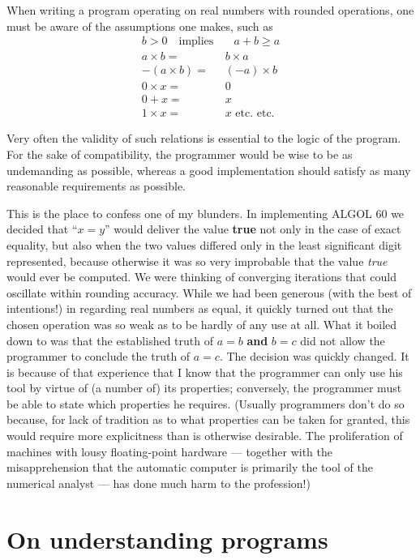 When writing a program operating on real numbers with rounded operations, one must be aware of the assumptions one makes, such as
\begin{equation*}
	\begin{split}
		b > 0\quad \text{implies}&\quad a + b \geqslant a\\
		a\times b =&\ b\times a\\
		-(a \times  b) =&\ (-a)\times b\\
		0\times  x =&\ 0\\
		0 + x =&\ x\\
		1\times x =&\ x\text{ etc. etc.}
	\end{split}
\end{equation*}

Very often the validity of such relations is essential to the logic of the program. For the sake of compatibility, the programmer would be wise to be as undemanding as possible, whereas a good implementation should satisfy as many reasonable requirements as possible.

This is the place to confess one of my blunders. In implementing ALGOL 60 we decided that ``$x = y$'' would deliver the value \textbf{true} not only in the case of exact equality, but also when the two values differed only in the least significant digit represented, because otherwise it was so very improbable that the value \textit{true} would ever be computed. We were thinking of converging iterations that could oscillate within rounding accuracy. While we had been generous (with the best of intentions!) in regarding real numbers as equal, it quickly turned out that the chosen operation was so weak as to be hardly of any use at all. What it boiled down to was that the established truth of $a = b$ \textbf{and} $b = c$ did not allow the programmer to conclude the truth of $a = c$. The decision was quickly changed. It is because of that experience that I know that the programmer can only use his tool by virtue of (a number of) its properties; conversely, the programmer must be able to state which properties he requires. (Usually programmers don't do so because, for lack of tradition as to what properties can be taken for granted, this would require more explicitness than is otherwise desirable. The proliferation of machines with lousy floating-point hardware --- together with the misapprehension that the automatic computer is primarily the tool of the numerical analyst --- has done much harm to the profession!)

\section{On understanding programs}

